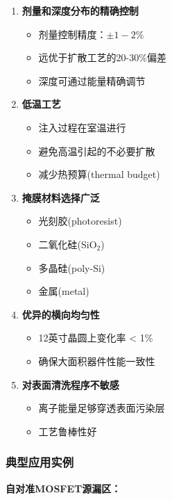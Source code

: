 \documentclass[UTF8,12pt,a4paper]{ctexart}
\begin{document}
\begin{enumerate}
    \item \textbf{剂量和深度分布的精确控制}
    \begin{itemize}
        \item 剂量控制精度：$\pm 1-2\%$
        \item 远优于扩散工艺的20-30\%偏差
        \item 深度可通过能量精确调节
    \end{itemize}
    
    \item \textbf{低温工艺}
    \begin{itemize}
        \item 注入过程在室温进行
        \item 避免高温引起的不必要扩散
        \item 减少热预算(thermal budget)
    \end{itemize}
    
    \item \textbf{掩膜材料选择广泛}
    \begin{itemize}
        \item 光刻胶(photoresist)
        \item 二氧化硅(SiO$_2$)
        \item 多晶硅(poly-Si)
        \item 金属(metal)
    \end{itemize}
    
    \item \textbf{优异的横向均匀性}
    \begin{itemize}
        \item 12英寸晶圆上变化率 < 1\%
        \item 确保大面积器件性能一致性
    \end{itemize}
    
    \item \textbf{对表面清洗程序不敏感}
    \begin{itemize}
        \item 离子能量足够穿透表面污染层
        \item 工艺鲁棒性好
    \end{itemize}
\end{enumerate}

\subsubsection{典型应用实例}

\textbf{自对准MOSFET源漏区：}
\end{document}

